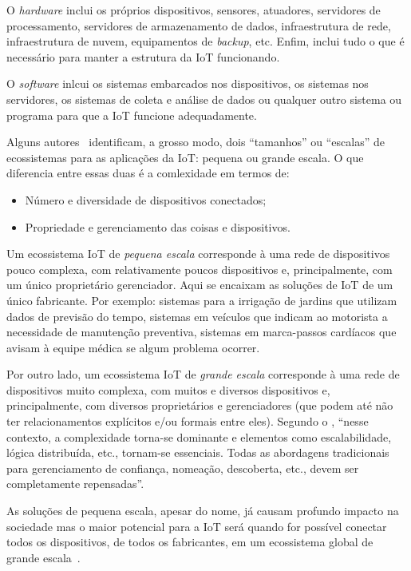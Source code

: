 \documentclass[pdftex, brazil, 12pt, twoside]{article}
\newcommand{\ingles}[1]{\textit{#1}}
\begin{document}
O \ingles{hardware} inclui os próprios dispositivos, sensores, atuadores,
servidores de processamento, servidores de armazenamento de dados,
infraestrutura de rede, infraestrutura de nuvem, equipamentos de \ingles{backup}, etc.
Enfim, inclui tudo o que é necessário para manter a estrutura da IoT funcionando.

O \ingles{software} inlcui os sistemas embarcados nos dispositivos, os sistemas
nos servidores, os sistemas de coleta e análise de dados ou qualquer outro
sistema ou programa para que a IoT funcione adequadamente.

Alguns autores~\citep{UKGOSWalportIoT2014,IEEEIoTDefinition,BarbozaTCCIoT2015}
identificam, a grosso modo, dois ``tamanhos'' ou ``escalas'' de ecossistemas
para as aplicações da IoT: pequena ou grande escala.
O que diferencia entre essas duas é a comlexidade em termos de:

\begin{itemize}[noitemsep]
\item Número e diversidade de dispositivos conectados;
\item Propriedade e gerenciamento das coisas e dispositivos.
\end{itemize}

Um ecossistema IoT de \emph{pequena escala} corresponde à uma rede de dispositivos
pouco complexa, com relativamente poucos dispositivos e, principalmente, com
um único proprietário gerenciador. Aqui se encaixam as soluções
de IoT de um único fabricante. Por exemplo: sistemas para a irrigação de jardins
que utilizam dados de previsão do tempo, sistemas em veículos que indicam ao
motorista a necessidade de manutenção preventiva, sistemas em marca-passos cardíacos
que avisam à equipe médica se algum problema ocorrer.

Por outro lado, um ecossistema IoT de \emph{grande escala} corresponde à uma rede
de dispositivos muito complexa, com muitos e diversos dispositivos e, principalmente, com
diversos proprietários e gerenciadores (que podem até não ter relacionamentos
explícitos e/ou formais entre eles). Segundo o \citet[][p.\ 75]{IEEEIoTDefinition}, ``nesse contexto,
a complexidade torna-se dominante e elementos como escalabilidade, lógica distribuída,
etc., tornam-se essenciais. Todas as abordagens tradicionais para gerenciamento
de confiança, nomeação, descoberta, etc., devem ser completamente repensadas''.

As soluções de pequena escala, apesar do nome, já causam profundo impacto na sociedade
mas o maior potencial para a IoT será quando for possível conectar todos os dispositivos,
de todos os fabricantes, em um ecossistema global de grande escala~\citep{UKGOSWalportIoT2014,IEEEIoTDefinition,BhattIoT,IEEEIoTReport,McKinseyIoTHype,MoolayilIoT2016,RajIoT2017,OliverWymanIoT2015,SAPFutureIoT,CiscoIoEPublicSectorOpportunity,CiscoIoTFAQ2013,CiscoIoTVS2013,CiscoIoEPublicSectorEconomicAnalysis,CiscoIoESurvey2013,CiscoIoEValuePrivate2013,CiscoIoEValuePublic2013}.
\end{document}
